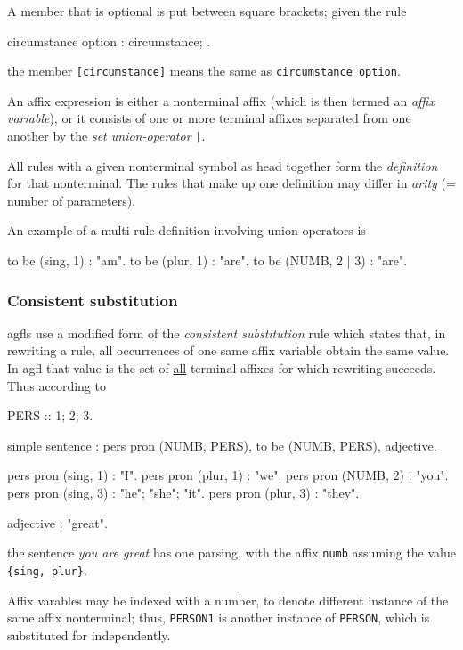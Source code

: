 A member that is optional is put between square brackets;
given the rule
\begin{elan}
circumstance option :
  circumstance;  .
\end{elan}
\noindent
the member {\tt [circumstance]} means the same as {\tt circumstance option}.

An affix expression is either a nonterminal affix (which is then termed an
{\em affix variable}), or it consists
of one or more terminal affixes separated from one another by
the {\em set union-operator} {\tt |}.

All rules with a given nonterminal symbol as head together form the
{\em definition} for that nonterminal.
The rules that make up one definition may differ in {\em arity} (= number of
parameters).

An example of a multi-rule definition involving union-operators is
\begin{elan}
to be (sing, 1) : "am".
to be (plur, 1) : "are".
to be (NUMB, 2 | 3) : "are".
\end{elan}
\subsubsection{Consistent substitution}
{\sc agfl}s use a modified form of the {\em consistent substitution} rule which
states that, in rewriting a rule, all occurrences of one same
affix variable obtain the same value.
In {\sc agfl} that value is the set of \underline{all}
terminal affixes for which rewriting succeeds. Thus according to
\begin{elan}
PERS :: 1; 2; 3.
\end{elan}
\begin{elan}
simple sentence :
  pers pron (NUMB, PERS), to be (NUMB, PERS), adjective.
\end{elan}
\begin{elan}
pers pron (sing, 1) : "I".
pers pron (plur, 1) : "we".
pers pron (NUMB, 2) : "you".
pers pron (sing, 3) : "he"; "she"; "it".
pers pron (plur, 3) : "they".
\end{elan}
\begin{elan}
adjective : "great".
\end{elan}
the sentence {\sl you are great} has one parsing, with the affix {\tt numb}
assuming the value {\tt \{sing, plur\}}.

Affix varables may be indexed with a number, to denote different instance
of the same affix nonterminal; thus, {\tt PERSON1} is another instance of
{\tt PERSON}, which is substituted for independently.
